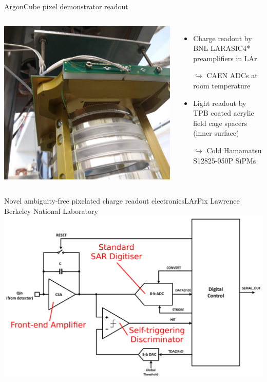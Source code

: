 \documentclass[]{beamer}
\newcommand*{\emphcol}{red}
\newcommand*{\AC}{{ArgonCube}}
\newcommand*{\larpix}{{LArPix}}
\begin{document}
\begin{frame}{\AC{} pixel demonstrator readout}
	\begin{columns}[c]
		\centering
		\includegraphics[width=\textwidth]{viper/viper_sipm}
		\begin{itemize}
			\item {\color{\emphcol} Charge readout by BNL LARASIC4* preamplifiers in LAr}
			\item[$\hookrightarrow$] CAEN ADCs at room temperature
			\item Light readout by TPB coated acrylic field cage spacers (inner surface)
			\item[$\hookrightarrow$] {\color{\emphcol} Cold Hamamatsu S12825-050P SiPMs}
		\end{itemize}
	\end{columns}
\end{frame}

\begin{frame}{Novel ambiguity-free pixelated charge readout electronics}{\larpix{}}
	{\tiny Lawrence Berkeley National Laboratory}\\
	\centering
	\includegraphics[height=.75\textheight]{larpix/schematic}
\end{frame}
\end{document}
